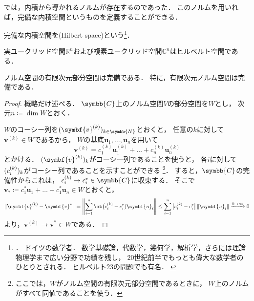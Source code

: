 \documentclass[../sotsu.tex]{subfiles}
\begin{document}
では，内積から導かれるノルムが存在するのであった．
このノルムを用いれば，完備な内積空間というものを定義することができる．

\begin{definition}[ヒルベルト空間]
    \label{dfn:Hilbert-space}
    完備な内積空間を(Hilbert space)という\footnote{
        ．
        ドイツの数学者．
        数学基礎論，代数学，幾何学，解析学，さらには理論物理学まで広い分野で功績を残し，
        20世紀前半でもっとも偉大な数学者のひとりとされる．
        ヒルベルト23の問題でも有名．
        \cite{nipponica}\cite{iwanami-sugakujiten}
    }．
\end{definition}

\begin{proposition}
    実ユークリッド空間$ℝ^n$および複素ユークリッド空間$ℂ^n$はヒルベルト空間である．
\end{proposition}





\begin{theorem}
    \label{thm:subspace-of-norm-space-is-complete}
    ノルム空間の有限次元部分空間は完備である\cite[定理1.2の系]{iwanami-functional}．
    特に，有限次元ノルム空間は完備である．
\end{theorem}

\begin{proof}
    概略だけ述べる．
    $\symbb{C}$上のノルム空間$V$の部分空間を$W$とし，
    次元$n \coloneq \dim W$とおく．
    
    $W$のコーシー列を$\sequ{\symbf{v}^{(k)}}[k \in \symbb{N}]$とおくと，
    任意の$k$に対して$\symbf{v}^{(k)} \in W$であるから，
    $W$の基底$\symbf{u}_1, \dots, \symbf{u}_n$を用いて
    \[  \symbf{v}^{(k)} = c^{(k)}_1 \symbf{u}^{(k)}_1 + \dots + c^{(k)}_n \symbf{u}^{(k)}_n  \]
    とかける．
    $\sequ{\symbf{v}^{(k)}}[k]$がコーシー列であることを使うと，
    各$i$に対して$\sequ{c^{(k)}_i}[k]$がコーシー列であることを示すことができる%
    \footnote{
        ここでは，$W$がノルム空間の有限次元部分空間であるときに，
        $W$上のノルムがすべて同値であることを使う\cite[定理1.2]{iwanami-functional}．
    }．
    すると，$\symbb{C}$の完備性からこれは，
    $c^{(k)}_i \to c^*_i \in \symbb{C}$に収束する．
    そこで$\symbf{v}_* \coloneq c^*_1 \symbf{u}_1 + \dots + c^*_1 \symbf{u}_n \in W$とおくと，
    \begin{equation*}
        \begin{split}
            \norm{ \symbf{v}^{(k)} - \symbf{v}^* }
                = \norm*{ \sum_{i = 1}^{n} \ab\big(c^{(k)}_i - c^*_i) \symbf{u}_i }
                \leq \sum_{i=1}^{n} \, \abs[\big]{ c^{(k)}_i - c^*_i } \, \norm{ \symbf{u}_i }
                \xrightarrow{k \to \infty} 0
        \end{split}
    \end{equation*}
    より，$\symbf{v}^{(k)} \to \symbf{v}^* \in W$である．
\end{proof}
\end{document}
